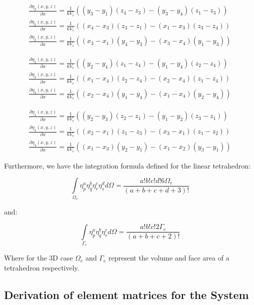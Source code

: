 \documentclass[12pt]{article}
\begin{document}
\begin{align*}
\frac{\partial \eta_2(x,y,z)}{\partial x} = \frac{1}{6V_e}((y_3-y_1)(z_4-z_3)-(y_3-y_4)(z_1-z_3)) \\
\frac{\partial \eta_2(x,y,z)}{\partial x} = \frac{1}{6V_e}((x_4-x_3)(z_3-z_1)-(x_1-x_3)(z_3-z_4)) \\
\frac{\partial \eta_2(x,y,z)}{\partial x} = \frac{1}{6V_e}((x_3-x_1)(y_4-y_3)-(x_3-x_4)(y_1-y_3))
\end{align*}

\begin{align*}
\frac{\partial \eta_3(x,y,z)}{\partial x} = \frac{1}{6V_e}((y_2-y_4)(z_1-z_4)-(y_1-y_4)(z_2-z_4)) \\
\frac{\partial \eta_3(x,y,z)}{\partial x} = \frac{1}{6V_e}((x_1-x_4)(z_2-z_4)-(x_2-x_4)(z_1-z_4)) \\
\frac{\partial \eta_3(x,y,z)}{\partial x} = \frac{1}{6V_e}((x_2-x_4)(y_1-y_4)-(x_1-x_4)(y_2-y_4))
\end{align*}

\begin{align*}
\frac{\partial \eta_4(x,y,z)}{\partial x} = \frac{1}{6V_e}((y_2-y_3)(z_2-z_1)-(y_1-y_2)(z_3-z_1)) \\
\frac{\partial \eta_4(x,y,z)}{\partial x} = \frac{1}{6V_e}((x_2-x_1)(z_1-z_3)-(x_3-x_1)(z_1-z_2)) \\
\frac{\partial \eta_4(x,y,z)}{\partial x} = \frac{1}{6V_e}((x_1-x_3)(y_2-y_1)-(x_1-x_2)(y_3-y_1))
\end{align*}

Furthermore, we have the integration formula defined for the linear tetrahedron:

\begin{equation}
 \int\limits_{\Omega_e} \eta_p^a \eta_q^b \eta_r^c \eta_s^d d{\Omega}=
 \frac{a!b!c!d!6\Omega_e}{(a+b+c+d+3)!}
\end{equation}

and:

\begin{equation}
 \int\limits_{\Gamma_e} \eta_p^a \eta_q^b \eta_r^c  d{\Omega}=
 \frac{a!b!c!2\Gamma_e}{(a+b+c+2)!}
\end{equation}

Where for the 3D case $\Omega_e$ and $\Gamma_e$ represent the volume and face area of a tetrahedron respectively.

\subsection{Derivation of element matrices for the System}
\end{document}
